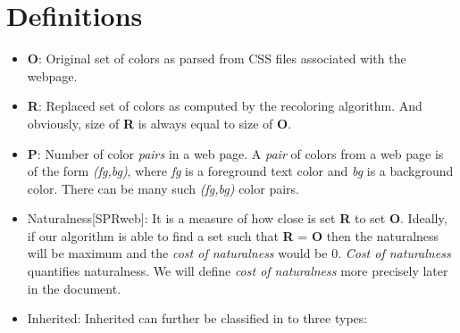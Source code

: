 \section{Definitions}
\label{Related Work}
\begin{itemize}
\item{\textbf{O}: } Original set of colors as parsed from CSS files associated with the webpage.
\item{\textbf{R}: } Replaced set of colors as computed by the recoloring algorithm. And obviously, size of \textbf{R} is always equal to size of \textbf{O}.
\item{\textbf{P}: } Number of color \textit{pairs} in a web page. A \textit{pair} of colors from a web page is of the form \textit{(fg,bg)}, where \textit{fg} is a foreground text color and \textit{bg} is a background color. There can be many such \textit{(fg,bg)} color pairs. 
\item{Naturalness[SPRweb]: } It is a measure of how close is set \textbf{R} to set \textbf{O}. Ideally, if our algorithm is able to find a set such that \textbf{R} = \textbf{O} then the naturalness will be maximum and the \textit{cost of naturalness} would be 0. \textit{Cost of naturalness} quantifies naturalness. We will define \textit{cost of naturalness} more precisely later in the document. 
\item{Inherited:} Inherited can further be classified in to three types:
\end{itemize}

